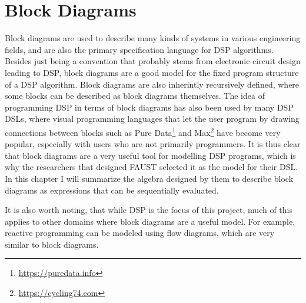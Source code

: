 \newcommand{\Block}[1]{\ensuremath{\textsc{#1}}\xspace}
\newcommand{\Ident}{\Block{ident}}
\newcommand{\Cut}{\Block{cut}}
\newcommand{\Sequential}{\Block{seq}}
\newcommand{\Parallel}{\Block{par}}
\newcommand{\Recursive}{\Block{rec}}
\newcommand{\Resample}{\Block{resample}}
\newcommand{\Split}{\Block{split}}
\newcommand{\Merge}{\Block{merge}}
\newcommand{\Mem}{\Block{mem}}
\newcommand{\Delay}{\Block{delay}}
\newcommand{\Ins}{\ensuremath{\textbf{ins}}\xspace}
\newcommand{\Outs}{\ensuremath{\textbf{outs}}\xspace}
\newcommand{\Sig}{\ensuremath{\mathbb{S}}\xspace}
\newcommand{\SigP}[1]{\ensuremath{\llbracket #1 \rrbracket}\xspace}


\chapter{Block Diagrams}
\label{chap:blocks}

Block diagrams are used to describe many kinds of systems in various engineering fields, and are also the
primary specification language for DSP algorithms\autocite{kahles2019oversampling, castillocomparative, thomas2009, pirkle2019designing, fiir}. Besides just being a convention
that probably stems from electronic circuit design leading to DSP, block diagrams are a good model for the
fixed program structure of a DSP algorithm. Block diagrams are also inherintly recursively defined, where
some blocks can be described as block diagrams themselves. The idea of programming DSP in terms of block
diagrams has also been used by many DSP DSLs, where visual programming languages that let the user program by
drawing connections between blocks such as Pure Data\footnote{\url{https://puredata.info}} and Max\footnote{\url{https://cycling74.com}}
have become very popular, especially with users who are not primarily programmers. It is thus clear that
block diagrams are a very useful tool for modelling DSP programs, which is why the researchers that designed
FAUST selected it as the model for their DSL\autocite{orlarey2004}. In this chapter I will summarize the
algebra designed by them to describe block diagrams as expressions that can be sequentially evaluated.

It is also worth noting, that while DSP is the focus of this project, much of this applies to other domains
where block diagrams are a useful model. For example, reactive programming\autocite{wan2000functional} can be
modeled using flow diagrams\autocite{reactiveprog}, which are very similar to block diagrams.

